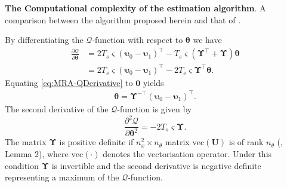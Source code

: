 \documentclass[11pt,draftcls,onecolumn,peerreview]{IEEEtran}
\begin{document}
\begin {table}
\begin{center}
 \caption {{\bf The Computational complexity of the estimation algorithm}. A comparison between the algorithm proposed herein and that of \cite{Dewar2009}.} 
\label{table:MRA-ComputationalComplexity}
\end{center}
\end {table}

By differentiating the $\mathcal Q$-function with respect to $\boldsymbol\theta$ we have
\begin{align}\label{eq:MRA-QDerivative}
\frac{\partial \mathcal Q}{\partial \boldsymbol\theta}&=2T_s\varsigma(\boldsymbol\upsilon_0-\boldsymbol\upsilon_1)^\top-T_s\varsigma(\boldsymbol\Upsilon^\top+\boldsymbol\Upsilon)\boldsymbol\theta \nonumber \\
&=2T_s\varsigma(\boldsymbol\upsilon_0-\boldsymbol\upsilon_1)^\top-2T_s\varsigma\boldsymbol\Upsilon^\top\boldsymbol\theta.
\end{align}
Equating \eqref{eq:MRA-QDerivative} to $\mathbf 0$ yields
\begin{align}\label{eq:MRA-thetahat}
\boldsymbol \theta= \boldsymbol\Upsilon^{-\top}(\boldsymbol\upsilon_0-\boldsymbol\upsilon_1)^\top.
\end{align}
The second derivative of the $\mathcal Q$-function is given by
\begin{equation}
\frac{\partial^2\mathcal Q}{\partial\boldsymbol\theta^2}=-2T_s\varsigma\boldsymbol\Upsilon.
\end{equation}
The matrix $\boldsymbol\Upsilon$ is positive definite if $n_x^2\times n_{\theta}$ matrix $\mathrm{vec}(\mathbf U)$ is of rank $n_{\theta}$ (\cite{Dewar2009}, Lemma 2), where $\mathrm{vec}(\cdot)$ denotes the vectorisation operator. Under this condition $\boldsymbol\Upsilon$ is  invertible and the second derivative is negative definite representing a maximum of the $\mathcal Q$-function. 
\end{document}
